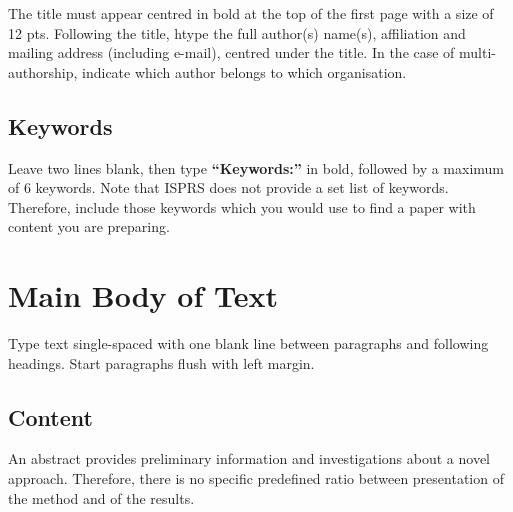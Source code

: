 \documentclass{isprs} %
\begin{document}
The title must appear centred in bold at the top of the first page with a size of 12 pts. Following the title, htype the full author(s) name(s), affiliation and mailing address (including e-mail), centred under the title. In the case of multi-authorship, indicate which author belongs to which organisation.




\subsection{Keywords}\label{sec:Keywords}

Leave two lines blank, then type \textbf{``Keywords:''} in bold, followed by a maximum of 6 keywords. Note that ISPRS does not provide a set list of keywords. Therefore, include those keywords which you would use to find a paper with content you are preparing.

\section{Main Body of Text}\label{sec:MAIN BODY OF TEXT}

Type text single-spaced with one blank line between paragraphs and
following headings. Start paragraphs flush with left margin.

\subsection{Content}\label{sec:Content}
An abstract provides preliminary information and investigations about a novel approach. Therefore, there is no specific predefined ratio between presentation of the method and of the results.
\end{document}

